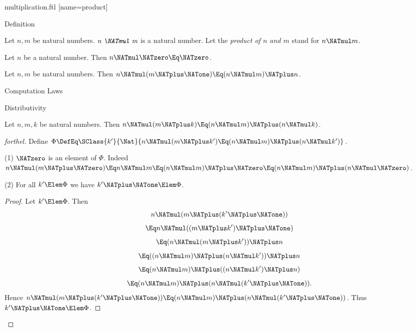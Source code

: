 \documentclass{stex}
\begin{document}
\begin{smodule}{multiplication.ftl}
[name=product]{\,\cdot\,}

\begin{sfragment}{Definition}
  \begin{signature}[forthel,for=NATmul]
    Let $n, m$ be natural numbers.
    $\emph{n \NATmul m}$ is a natural number.
    Let the \emph{product of $n$ and $m$} stand for $n \NATmul m$.
  \end{signature}

  \begin{axiom}[forthel,for=NATmul]
    Let $n$ be a natural number.
    Then $n \NATmul \NATzero \Eq \NATzero$.
  \end{axiom}

  \begin{axiom}[forthel,for=NATmul]
    Let $n, m$ be natural numbers.
    Then $n \NATmul (m \NATplus \NATone) \Eq (n \NATmul m) \NATplus n$.
  \end{axiom}
\end{sfragment}

\begin{sfragment}{Computation Laws}
  \begin{sfragment}{Distributivity}


    \begin{proposition}[forthel,name=left-distributivity of multiplication over addition]
      Let $n, m, k$ be natural numbers.
      Then $n \NATmul (m \NATplus k) \Eq (n \NATmul m) \NATplus (n \NATmul k)$.
    \end{proposition}
    \begin{proof}[forthel]
      Define $\Phi \DefEq \SClass{k'}{\Nat}{n \NATmul (m \NATplus k') \Eq (n \NATmul m) \NATplus (n \NATmul k')}$.

      (1) $\NATzero$ is an element of $\Phi$.
      Indeed $n \NATmul (m \NATplus \NATzero)
        \Eq n \NATmul m
        \Eq (n \NATmul m) \NATplus \NATzero
        \Eq (n \NATmul m) \NATplus (n \NATmul \NATzero)$.

      (2) For all $k' \Elem \Phi$ we have $k' \NATplus \NATone \Elem \Phi$. 
      \begin{proof}
        Let $k'\Elem \Phi$.
        Then
        \[  n \NATmul (m \NATplus (k' \NATplus \NATone))                  \]
        \[    \Eq n \NATmul ((m \NATplus k') \NATplus \NATone)              \]
        \[    \Eq (n \NATmul (m \NATplus k')) \NATplus n              \]
        \[    \Eq ((n \NATmul m) \NATplus (n \NATmul k')) \NATplus n    \]
        \[    \Eq (n \NATmul m) \NATplus ((n \NATmul k') \NATplus n)    \]
        \[    \Eq (n \NATmul m) \NATplus (n \NATmul (k' \NATplus \NATone)).   \]
        Hence $n \NATmul (m \NATplus (k' \NATplus \NATone)) \Eq (n \NATmul m) \NATplus (n \NATmul (k' \NATplus \NATone))$.
        Thus $k' \NATplus \NATone \Elem \Phi$.
      \end{proof}


\end{proof}
\end{sfragment}
\end{sfragment}
\end{smodule}
\end{document}
